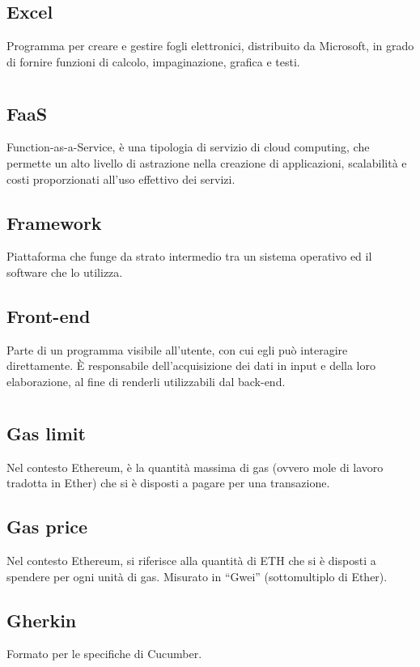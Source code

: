 	\subsection*{Excel}
	Programma per creare e gestire fogli elettronici, distribuito da Microsoft, in grado di fornire funzioni di calcolo, impaginazione, grafica e testi.
\pagebreak
\section{}
	\subsection*{FaaS}
	Function-as-a-Service, è una tipologia di servizio di cloud computing, che permette un alto livello di astrazione nella creazione di applicazioni, scalabilità e costi proporzionati all’uso effettivo dei servizi.
	\subsection*{Framework}
	Piattaforma che funge da strato intermedio tra un sistema operativo ed il software che lo utilizza.
	\subsection*{Front-end}
	Parte di un programma visibile all’utente, con cui egli può interagire direttamente. È responsabile dell’acquisizione dei dati in input e della loro elaborazione, al fine di renderli utilizzabili dal back-end.
\pagebreak
\section{}
	\subsection*{Gas limit}
	Nel contesto Ethereum, è la quantità massima di gas (ovvero mole di lavoro tradotta in Ether) che si è disposti a pagare per una transazione.
	\subsection*{Gas price}
	Nel contesto Ethereum, si riferisce alla quantità di ETH che si è disposti a spendere per ogni unità di gas. Misurato in “Gwei” (sottomultiplo di Ether).
	\subsection*{Gherkin}
	Formato per le specifiche di Cucumber.
